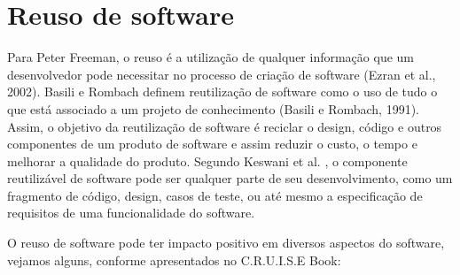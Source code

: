 \section{Reuso de software}\label{sec:reuso} %


Para Peter Freeman, o reuso é a utilização de qualquer informação que um desenvolvedor pode necessitar no processo de criação de software (Ezran et al., 2002). Basili e Rombach definem reutilização de software como o uso de tudo o que está associado a um projeto de conhecimento (Basili e Rombach, 1991).
Assim, o objetivo da reutilização de software é reciclar o design, código e outros componentes de um produto de software e assim reduzir o custo, o tempo e melhorar a qualidade do produto.
Segundo Keswani et al. \cite{6783445}, o componente reutilizável de software pode ser qualquer parte de seu desenvolvimento, como um fragmento de código, design, casos de teste, ou até mesmo a especificação de requisitos de uma funcionalidade do software. 

O reuso de software pode ter impacto positivo em diversos aspectos do software, vejamos alguns, conforme apresentados no C.R.U.I.S.E Book:

